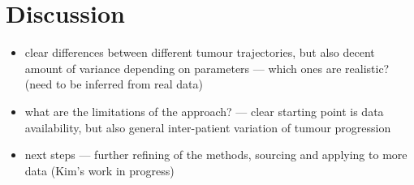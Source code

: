 
\section{Discussion}
\begin{itemize}
    \item clear differences between different tumour trajectories, but also decent amount of variance depending on parameters --- which ones are realistic? (need to be inferred from real data)
    \item what are the limitations of the approach? --- clear starting point is data availability, but also general inter-patient variation of tumour progression
    \item next steps --- further refining of the methods, sourcing and applying to more data (Kim's work in progress)
\end{itemize}

